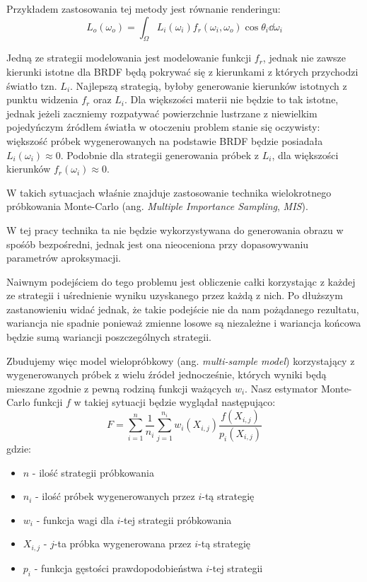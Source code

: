 \documentclass[../main.tex]{subfiles}
\begin{document}
Przykładem zastosowania tej metody jest równanie renderingu:
\[
L_o(\omega_o) = \int_{\Omega} {
	L_i(\omega_{i})
	f_r(\omega_{i}, \omega_{o})
	\cos \theta_{i}
	\dd\omega_{i}
}
\]

Jedną ze strategii modelowania jest modelowanie funkcji $f_r$, jednak nie zawsze kierunki istotne dla BRDF będą pokrywać się z kierunkami z których przychodzi światło tzn. $L_i$. Najlepszą strategią, byłoby generowanie kierunków istotnych z punktu widzenia $f_r$ oraz $L_i$. Dla większości materii nie będzie to tak istotne, jednak jeżeli zaczniemy rozpatywać powierzchnie lustrzane z niewielkim pojedyńczym źródłem światła w otoczeniu problem stanie się oczywisty: większość próbek wygenerowanych na podstawie BRDF będzie posiadała $L_i(\omega_i) \approx 0$. Podobnie dla strategii generowania próbek z $L_i$, dla większości kierunków $f_r(\omega_i) \approx 0$.

W takich sytuacjach właśnie znajduje zastosowanie technika wielokrotnego próbkowania Monte-Carlo (ang. \textit{Multiple Importance Sampling}, \textit{MIS}).

W tej pracy technika ta nie będzie wykorzystywana do generowania obrazu w spośób bezpośredni, jednak jest ona nieoceniona przy dopasowywaniu parametrów aproksymacji.

Naiwnym podejściem do tego problemu jest obliczenie całki korzystając z każdej ze strategii i uśrednienie wyniku uzyskanego przez każdą z nich. Po dłuższym zastanowieniu widać jednak, że takie podejście nie da nam pożądanego rezultatu, wariancja nie spadnie ponieważ zmienne losowe są niezależne i wariancja końcowa będzie sumą wariancji poszczególnych strategii.

Zbudujemy więc model wielopróbkowy (ang. \textit{multi-sample model}) \cite{pbrt,ImportanceSamplingForProduction} korzystający z wygenerowanych próbek z wielu źródeł jednocześnie, których wyniki będą mieszane zgodnie z pewną rodziną funkcji ważących $w_i$. Nasz estymator Monte-Carlo funkcji $f$ w takiej sytuacji będzie wyglądał następująco:
\[
  F = \sum_{i=1}^{n} \frac{1}{n_i} \sum_{j=1}^{n_i} w_{i}(X_{i,j}) \frac{
    f(X_{i,j})
  }{
    p_{i}(X_{i,j})
  }
\]
\noindent gdzie:
\begin{itemize}
	\item $n$ - ilość strategii próbkowania
	\item $n_i$ - ilość próbek wygenerowanych przez $i$-tą strategię
	\item $w_i$ - funkcja wagi dla $i$-tej strategii próbkowania
	\item $X_{i,j}$ - $j$-ta próbka wygenerowana przez $i$-tą strategię
	\item $p_i$ - funkcja gęstości prawdopodobieństwa $i$-tej strategii
\end{itemize}
\end{document}
